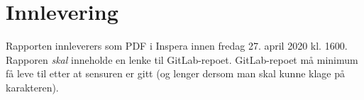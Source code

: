 \documentclass[11pt,a4paper]{article}
\begin{document}
\section{Innlevering}

Rapporten innleverers som PDF i Inspera innen fredag 27. april 2020 kl. 1600. Rapporen \emph{skal} inneholde en lenke til GitLab-repoet. GitLab-repoet må minimum få leve til etter at sensuren er gitt (og lenger dersom man skal kunne klage på karakteren).



\end{document}
